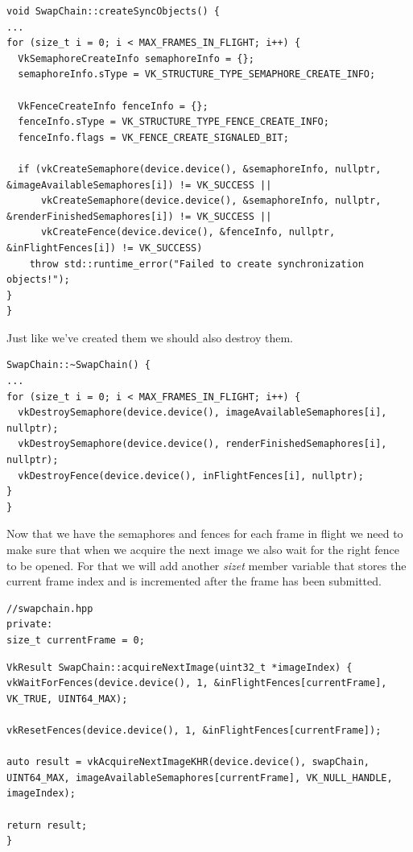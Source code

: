 \documentclass[12pt]{report} \usepackage{preamble}
\begin{document}
\begin{lstlisting}[Language=C++]
void SwapChain::createSyncObjects() {
...
for (size_t i = 0; i < MAX_FRAMES_IN_FLIGHT; i++) {
  VkSemaphoreCreateInfo semaphoreInfo = {};
  semaphoreInfo.sType = VK_STRUCTURE_TYPE_SEMAPHORE_CREATE_INFO;

  VkFenceCreateInfo fenceInfo = {};
  fenceInfo.sType = VK_STRUCTURE_TYPE_FENCE_CREATE_INFO;
  fenceInfo.flags = VK_FENCE_CREATE_SIGNALED_BIT;

  if (vkCreateSemaphore(device.device(), &semaphoreInfo, nullptr, &imageAvailableSemaphores[i]) != VK_SUCCESS ||
      vkCreateSemaphore(device.device(), &semaphoreInfo, nullptr, &renderFinishedSemaphores[i]) != VK_SUCCESS ||
      vkCreateFence(device.device(), &fenceInfo, nullptr, &inFlightFences[i]) != VK_SUCCESS)
    throw std::runtime_error("Failed to create synchronization objects!");
}
}
\end{lstlisting}

Just like we've created them we should also destroy them.

\begin{lstlisting}[Language=C++]
SwapChain::~SwapChain() {
...
for (size_t i = 0; i < MAX_FRAMES_IN_FLIGHT; i++) {
  vkDestroySemaphore(device.device(), imageAvailableSemaphores[i], nullptr);
  vkDestroySemaphore(device.device(), renderFinishedSemaphores[i], nullptr);
  vkDestroyFence(device.device(), inFlightFences[i], nullptr);
}
}
\end{lstlisting}

Now that we have the semaphores and fences for each frame in flight we need to make sure that when we acquire the next image we also
wait for the right fence to be opened. For that we will add another \textit{size\textunderscore t} member variable that stores the
current frame index and is incremented after the frame has been submitted.

\begin{lstlisting}[Language=C++]
//swapchain.hpp
private:
size_t currentFrame = 0;
\end{lstlisting}

\begin{lstlisting}[Language=C++]
VkResult SwapChain::acquireNextImage(uint32_t *imageIndex) {
vkWaitForFences(device.device(), 1, &inFlightFences[currentFrame], VK_TRUE, UINT64_MAX);

vkResetFences(device.device(), 1, &inFlightFences[currentFrame]);

auto result = vkAcquireNextImageKHR(device.device(), swapChain, UINT64_MAX, imageAvailableSemaphores[currentFrame], VK_NULL_HANDLE, imageIndex);

return result;
}
\end{lstlisting}
\end{document}
